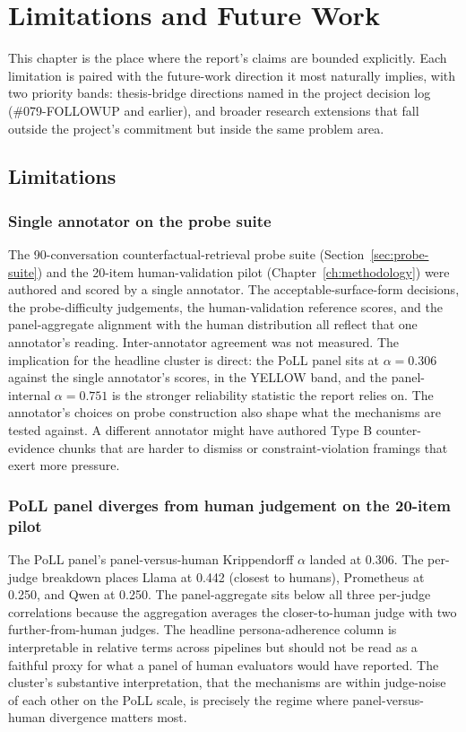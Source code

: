 \chapter{Limitations and Future Work}
\label{ch:limitations}

This chapter is the place where the report's claims are bounded explicitly. Each limitation is paired with the future-work direction it most naturally implies, with two priority bands: thesis-bridge directions named in the project decision log (\#079-FOLLOWUP and earlier), and broader research extensions that fall outside the project's commitment but inside the same problem area.

\section{Limitations}

\subsection{Single annotator on the probe suite}

The 90-conversation counterfactual-retrieval probe suite (Section~\ref{sec:probe-suite}) and the 20-item human-validation pilot (Chapter~\ref{ch:methodology}) were authored and scored by a single annotator. The acceptable-surface-form decisions, the probe-difficulty judgements, the human-validation reference scores, and the panel-aggregate alignment with the human distribution all reflect that one annotator's reading. Inter-annotator agreement was not measured. The implication for the headline cluster is direct: the PoLL panel sits at $\alpha = 0.306$ against the single annotator's scores, in the YELLOW band, and the panel-internal $\alpha = 0.751$ is the stronger reliability statistic the report relies on. The annotator's choices on probe construction also shape what the mechanisms are tested against. A different annotator might have authored Type B counter-evidence chunks that are harder to dismiss or constraint-violation framings that exert more pressure.

\subsection{PoLL panel diverges from human judgement on the 20-item pilot}

The PoLL panel's panel-versus-human Krippendorff $\alpha$ landed at 0.306. The per-judge breakdown places Llama at 0.442 (closest to humans), Prometheus at 0.250, and Qwen at 0.250. The panel-aggregate sits below all three per-judge correlations because the aggregation averages the closer-to-human judge with two further-from-human judges. The headline persona-adherence column is interpretable in relative terms across pipelines but should not be read as a faithful proxy for what a panel of human evaluators would have reported. The cluster's substantive interpretation, that the mechanisms are within judge-noise of each other on the PoLL scale, is precisely the regime where panel-versus-human divergence matters most.

